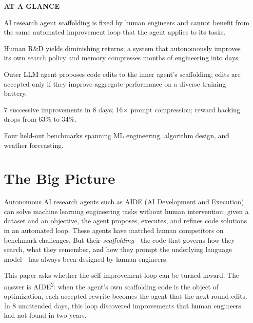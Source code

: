 \documentclass[10pt,twocolumn]{article}
\begin{document}
\begin{mdframed}[backgroundcolor=boxgray,linecolor=rulered,linewidth=1pt,
    innerleftmargin=6pt,innerrightmargin=6pt,
    innertopmargin=6pt,innerbottommargin=6pt]
\textbf{\small AT A GLANCE}\par\vspace{4pt}
\begin{description}[leftmargin=0pt,labelsep=4pt,itemsep=2pt,parsep=0pt,
    font=\small\bfseries]
  \item[Problem:] AI research agent scaffolding is fixed by human engineers and
    cannot benefit from the same automated improvement loop that the agent
    applies to its tasks.
  \item[Why it matters:] Human R\&D yields diminishing returns; a system that
    autonomously improves its own search policy and memory compresses months of
    engineering into days.
  \item[Method:] Outer LLM agent proposes code edits to the inner agent's
    scaffolding; edits are accepted only if they improve aggregate performance
    on a diverse training battery.
  \item[Result:] 7 successive improvements in 8 days; 16$\times$ prompt
    compression; reward hacking drops from 63\% to 34\%.
  \item[Evidence:] Four held-out benchmarks spanning ML engineering, algorithm
    design, and weather forecasting.
\end{description}
\end{mdframed}

\section{The Big Picture}

Autonomous AI research agents such as AIDE (AI Development and Execution) can
solve machine learning engineering tasks without human intervention: given a
dataset and an objective, the agent proposes, executes, and refines code
solutions in an automated loop. These agents have matched human competitors on
benchmark challenges. But their \emph{scaffolding}---the code that governs
how they search, what they remember, and how they prompt the underlying
language model---has always been designed by human engineers.

This paper asks whether the self-improvement loop can be turned inward. The
answer is AIDE\textsuperscript{2}: when the agent's own scaffolding code is the
object of optimization, each accepted rewrite becomes the agent that the next
round edits. In 8 unattended days, this loop discovered improvements that human
engineers had not found in two years.
\end{document}
